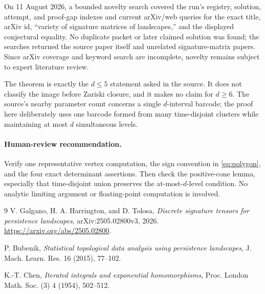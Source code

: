 \documentclass[11pt]{article}
\begin{document}
On 11 August 2026, a bounded novelty search covered the run's registry, solution, attempt, and proof-gap indexes and current arXiv/web queries for the exact title, arXiv id, ``variety of signature matrices of landscapes,'' and the displayed conjectural equality.  No duplicate packet or later claimed solution was found; the searches returned the source paper itself and unrelated signature-matrix papers.  Since arXiv coverage and keyword search are incomplete, novelty remains subject to expert literature review.

The theorem is exactly the $d\leq5$ statement asked in the source.  It does not classify the image before Zariski closure, and it makes no claim for $d\geq6$.  The source's nearby parameter count concerns a single $d$-interval barcode; the proof here deliberately uses one barcode formed from many time-disjoint clusters while maintaining at most $d$ simultaneous levels.

\paragraph{Human-review recommendation.}
Verify one representative vertex computation, the sign convention in \eqref{eq:polygon}, and the four exact determinant assertions.  Then check the positive-cone lemma, especially that time-disjoint union preserves the at-most-$d$-level condition.  No analytic limiting argument or floating-point computation is involved.

\begin{thebibliography}{9}
V. Galgano, H. A. Harrington, and D. Tolosa,
\emph{Discrete signature tensors for persistence landscapes},
arXiv:2505.02800v3, 2026.
\url{https://arxiv.org/abs/2505.02800}.

P. Bubenik,
\emph{Statistical topological data analysis using persistence landscapes},
J. Mach. Learn. Res. 16 (2015), 77--102.

K.-T. Chen,
\emph{Iterated integrals and exponential homomorphisms},
Proc. London Math. Soc. (3) 4 (1954), 502--512.
\end{thebibliography}
\end{document}
